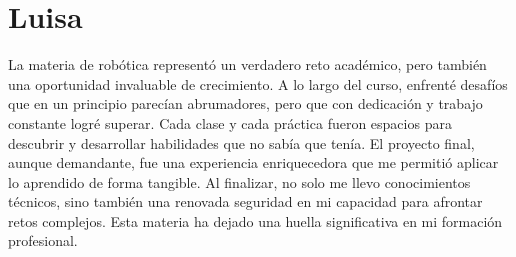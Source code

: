 \section{Luisa}
La materia de robótica representó un verdadero reto académico, pero también una oportunidad invaluable de crecimiento. A lo largo del curso, enfrenté desafíos que en un principio parecían abrumadores, pero que con dedicación y trabajo constante logré superar. Cada clase y cada práctica fueron espacios para descubrir y desarrollar habilidades que no sabía que tenía. El proyecto final, aunque demandante, fue una experiencia enriquecedora que me permitió aplicar lo aprendido de forma tangible. Al finalizar, no solo me llevo conocimientos técnicos, sino también una renovada seguridad en mi capacidad para afrontar retos complejos. Esta materia ha dejado una huella significativa en mi formación profesional.